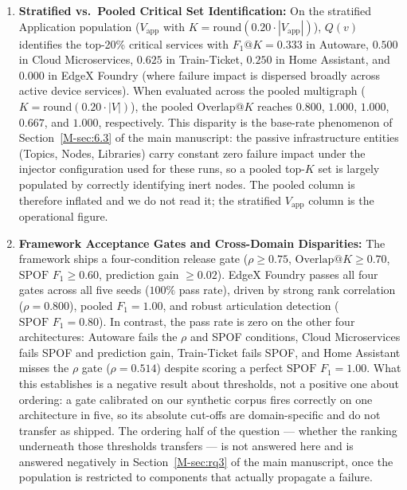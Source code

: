 \documentclass[preprint,3p]{elsarticle}
\begin{document}
\begin{enumerate}
    \item \textbf{Stratified vs.\ Pooled Critical Set Identification:} On the stratified Application population ($V_{\text{app}}$ with $K = \text{round}(0.20 \cdot |V_{\text{app}}|)$), $Q(v)$ identifies the top-20\% critical services with $F_1@K = 0.333$ in Autoware, $0.500$ in Cloud Microservices, $0.625$ in Train-Ticket, $0.250$ in Home Assistant, and $0.000$ in EdgeX Foundry (where failure impact is dispersed broadly across active device services). When evaluated across the pooled multigraph ($K = \text{round}(0.20 \cdot |V|)$), the pooled Overlap@$K$ reaches $0.800$, $1.000$, $1.000$, $0.667$, and $1.000$, respectively. This disparity is the base-rate phenomenon of Section~\ref{M-sec:6.3} of the main manuscript: the passive infrastructure entities (Topics, Nodes, Libraries) carry constant zero failure impact under the injector configuration used for these runs, so a pooled top-$K$ set is largely populated by correctly identifying inert nodes. The pooled column is therefore inflated and we do not read it; the stratified $V_{\text{app}}$ column is the operational figure.
    \item \textbf{Framework Acceptance Gates and Cross-Domain Disparities:} The framework ships a four-condition release gate ($\rho \ge 0.75$, $\text{Overlap@}K \ge 0.70$, $\text{SPOF } F_1 \ge 0.60$, prediction gain $\ge 0.02$). EdgeX Foundry passes all four gates across all five seeds ($100\%$ pass rate), driven by strong rank correlation ($\rho = 0.800$), pooled $F_1 = 1.00$, and robust articulation detection ($\text{SPOF } F_1 = 0.80$). In contrast, the pass rate is zero on the other four architectures: Autoware fails the $\rho$ and SPOF conditions, Cloud Microservices fails SPOF and prediction gain, Train-Ticket fails SPOF, and Home Assistant misses the $\rho$ gate ($\rho = 0.514$) despite scoring a perfect $\text{SPOF } F_1 = 1.00$. What this establishes is a negative result about thresholds, not a positive one about ordering: a gate calibrated on our synthetic corpus fires correctly on one architecture in five, so its absolute cut-offs are domain-specific and do not transfer as shipped. The ordering half of the question --- whether the ranking underneath those thresholds transfers --- is not answered here and is answered negatively in Section~\ref{M-sec:rq3} of the main manuscript, once the population is restricted to components that actually propagate a failure.


\end{enumerate}
\end{document}
